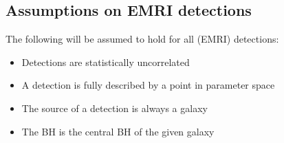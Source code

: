 \subsection{Assumptions on EMRI detections}
The following will be assumed to hold for all (EMRI) detections:
\begin{itemize}
    \item Detections are statistically uncorrelated
    \item A detection is fully described by a point in parameter space
    \item The source of a detection is always a galaxy
    \item The BH is the central BH of the given galaxy
\end{itemize}
